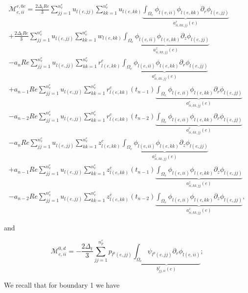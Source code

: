 \documentclass{article}
\begin{document}
\begin{equation}
\begin{array}{l} \mathcal{M}_{e,ii}^{r,0c} = \frac{2\Delta_t Re}{3} \sum_{jj=1}^{n_v^e} u_{l(e,jj)} \sum_{kk=1}^{n_v^e} u_{l(e,kk)} \underbrace{ \int_{\Omega_e} \phi_{l(e,ii)} \phi_{l(e,kk)} \partial_r \phi_{l(e,jj)} }_{a_{ii,kk,jj}^r(e)} \\ + \frac{2\Delta_t Re}{3} \sum_{jj=1}^{n_v^e} u_{l(e,jj)} \sum_{kk=1}^{n_v^e} w_{l(e,kk)} \underbrace{ \int_{\Omega_e} \phi_{l(e,ii)} \phi_{l(e,kk)} \partial_z \phi_{l(e,jj)} }_{a_{ii,kk,jj}^z(e)} \\ - a_n Re \sum_{jj=1}^{n_v^e} u_{l(e,jj)} \sum_{kk=1}^{n_v^e} r_{l(e,kk)}^c \underbrace{ \int_{\Omega_e} \phi_{l(e,ii)} \phi_{l(e,kk)} \partial_r \phi_{l(e,jj)} }_{a_{ii,kk,jj}^r(e)} \\ + a_{n-1} Re \sum_{jj=1}^{n_v^e} u_{l(e,jj)} \sum_{kk=1}^{n_v^e} r_{l(e,kk)}^c(t_{n-1}) \underbrace{ \int_{\Omega_e} \phi_{l(e,ii)} \phi_{l(e,kk)} \partial_r \phi_{l(e,jj)} }_{a_{ii,kk,jj}^r(e)} \\ - a_{n-2} Re \sum_{jj=1}^{n_v^e} u_{l(e,jj)} \sum_{kk=1}^{n_v^e} r_{l(e,kk)}^c(t_{n-2}) \underbrace{ \int_{\Omega_e} \phi_{l(e,ii)} \phi_{l(e,kk)} \partial_r \phi_{l(e,jj)} }_{a_{ii,kk,jj}^r(e)} \\ - a_n Re \sum_{jj=1}^{n_v^e} u_{l(e,jj)} \sum_{kk=1}^{n_v^e} z_{l(e,kk)}^c \underbrace{ \int_{\Omega_e} \phi_{l(e,ii)} \phi_{l(e,kk)} \partial_z \phi_{l(e,jj)} }_{a_{ii,kk,jj}^z(e)} \\ + a_{n-1} Re \sum_{jj=1}^{n_v^e} u_{l(e,jj)} \sum_{kk=1}^{n_v^e} z_{l(e,kk)}^c(t_{n-1}) \underbrace{ \int_{\Omega_e} \phi_{l(e,ii)} \phi_{l(e,kk)} \partial_z \phi_{l(e,jj)} }_{a_{ii,kk,jj}^z(e)} \\ - a_{n-2} Re \sum_{jj=1}^{n_v^e} u_{l(e,jj)} \sum_{kk=1}^{n_v^e} z_{l(e,kk)}^c(t_{n-2}) \underbrace{ \int_{\Omega_e} \phi_{l(e,ii)} \phi_{l(e,kk)} \partial_z \phi_{l(e,jj)} }_{a_{ii,kk,jj}^z(e)}, \end{array} \tag{4.134}
\end{equation}

and

\begin{equation}
\mathcal{M}_{e,ii}^{0,d} = -\frac{2\Delta_t}{3} \sum_{jj=1}^{n_p^e} p_{l^p(e,jj)} \underbrace{ \int_{\Omega_e} \psi_{l^p(e,jj)} \partial_r \phi_{l(e,ii)} }_{b_{jj,ii}^r(e)}; \tag{4.135}
\end{equation}

We recall that for boundary 1 we have
\end{document}

